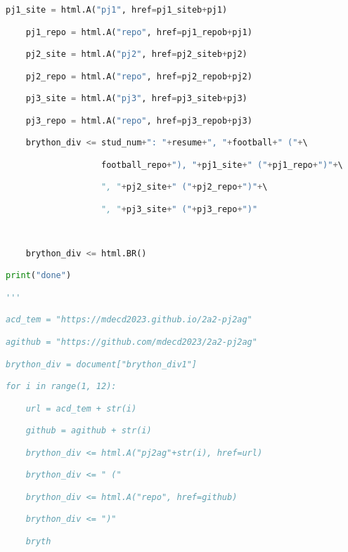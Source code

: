 \begin{lstlisting}[language=Python]
    pj1_site = html.A("pj1", href=pj1_siteb+pj1) 

    pj1_repo = html.A("repo", href=pj1_repob+pj1) 

    pj2_site = html.A("pj2", href=pj2_siteb+pj2) 

    pj2_repo = html.A("repo", href=pj2_repob+pj2) 

    pj3_site = html.A("pj3", href=pj3_siteb+pj3) 

    pj3_repo = html.A("repo", href=pj3_repob+pj3) 

    brython_div <= stud_num+": "+resume+", "+football+" ("+\ 

                   football_repo+"), "+pj1_site+" ("+pj1_repo+")"+\ 

                   ", "+pj2_site+" ("+pj2_repo+")"+\ 

                   ", "+pj3_site+" ("+pj3_repo+")" 

  

    brython_div <= html.BR() 

print("done") 

''' 

acd_tem = "https://mdecd2023.github.io/2a2-pj2ag" 

agithub = "https://github.com/mdecd2023/2a2-pj2ag" 

brython_div = document["brython_div1"] 

for i in range(1, 12): 

    url = acd_tem + str(i) 

    github = agithub + str(i) 

    brython_div <= html.A("pj2ag"+str(i), href=url) 

    brython_div <= " (" 

    brython_div <= html.A("repo", href=github) 

    brython_div <= ")" 

    bryth  
\end{lstlisting}
\newpage
